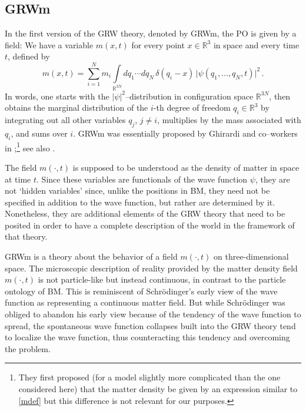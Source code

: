 \documentclass[12pt]{article}
\newcommand{\RRR}{\mathbb{R}}
\begin{document}
\subsection{GRWm}
\label{sec:GRWm}

In the first version of the {\sf GRW} theory, denoted by {\sf GRWm}, the PO is given by a field: We have a variable $m(x,t)$ for every point $x \in \RRR^3$ in space and every time $t$, defined by 
\begin{equation}\label{mdef}
 m(x,t) = \sum_{i=1}^N m_i \int\limits_{\RRR^{3N}}  dq_1 \cdots dq_N \, \delta(q_i-x) \,  \bigl|\psi(q_1, \ldots, q_N,t)\bigr|^2 \,.
\end{equation}
In words, one starts with the $|\psi|^2$--distribution in configuration
space $\RRR^{3N}$, then obtains the marginal distribution of 
the $i$-th degree of freedom $q_i\in \RRR^3$
by integrating out
all other variables $q_j$, $j \neq i$, multiplies by the mass associated with $q_i$, and sums over $i$.
{\sf GRWm} was essentially proposed by Ghirardi and co--workers
in \citep{Ghi};\footnote{They first proposed (for a model slightly more complicated than the one considered here)
that the matter density be given by an expression similar to \eqref{mdef} but this difference is not relevant for our purposes.} see also \citep{Gol98}.

The field $m(\cdot,t)$ is supposed to be understood as the
density of matter in space at time $t$. Since these variables are
functionals of the wave function $\psi$, they are not `hidden
variables' since, unlike the positions in {\sf BM}, they need not be specified in 
addition to the wave function, but rather are determined by it. Nonetheless, they are additional elements of the {\sf GRW} theory that need to be posited in order to have a complete description of the world in the framework of that theory. %

{\sf GRWm} is a theory about the behavior of a field $m(\cdot,t)$ on three-dimensional space. The microscopic description of reality provided by the matter density field $m(\cdot,t)$ is not particle-like but instead continuous, in contrast to the particle ontology of {\sf BM}.  
This is reminiscent of Schr\"odinger's early view of the wave function as representing a continuous matter field. But while Schr\"odinger was obliged to abandon his early view because of the tendency of the wave function to spread,  
the spontaneous wave function collapses built into the {\sf GRW} theory tend to localize the wave function, thus counteracting this tendency and overcoming the problem. 
 
\end{document}
